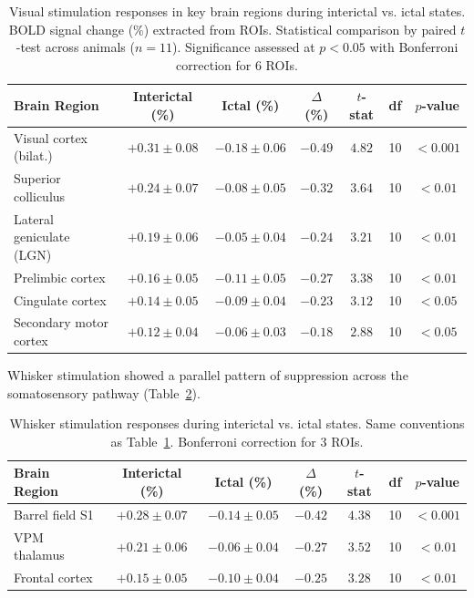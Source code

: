 \documentclass[11pt]{article}
\begin{document}
\begin{table}[H]
\centering
\caption{Visual stimulation responses in key brain regions during interictal vs. ictal states. BOLD signal change (\%) extracted from ROIs. Statistical comparison by paired $t$-test across animals ($n = 11$). Significance assessed at $p < 0.05$ with Bonferroni correction for 6 ROIs.}
\label{tab:visual}
\begin{tabular}{lcccccc}
\toprule
\textbf{Brain Region} & \textbf{Interictal (\%)} & \textbf{Ictal (\%)} & \textbf{$\Delta$ (\%)} & \textbf{$t$-stat} & \textbf{df} & \textbf{$p$-value} \\
\midrule
Visual cortex (bilat.) & $+0.31 \pm 0.08$ & $-0.18 \pm 0.06$ & $-0.49$ & $4.82$ & 10 & $< 0.001$ \\
Superior colliculus & $+0.24 \pm 0.07$ & $-0.08 \pm 0.05$ & $-0.32$ & $3.64$ & 10 & $< 0.01$ \\
Lateral geniculate (LGN) & $+0.19 \pm 0.06$ & $-0.05 \pm 0.04$ & $-0.24$ & $3.21$ & 10 & $< 0.01$ \\
Prelimbic cortex & $+0.16 \pm 0.05$ & $-0.11 \pm 0.05$ & $-0.27$ & $3.38$ & 10 & $< 0.01$ \\
Cingulate cortex & $+0.14 \pm 0.05$ & $-0.09 \pm 0.04$ & $-0.23$ & $3.12$ & 10 & $< 0.05$ \\
Secondary motor cortex & $+0.12 \pm 0.04$ & $-0.06 \pm 0.03$ & $-0.18$ & $2.88$ & 10 & $< 0.05$ \\
\bottomrule
\end{tabular}
\end{table}

Whisker stimulation showed a parallel pattern of suppression across the somatosensory pathway (Table~\ref{tab:whisker}).

\begin{table}[H]
\centering
\caption{Whisker stimulation responses during interictal vs. ictal states. Same conventions as Table~\ref{tab:visual}. Bonferroni correction for 3 ROIs.}
\label{tab:whisker}
\begin{tabular}{lcccccc}
\toprule
\textbf{Brain Region} & \textbf{Interictal (\%)} & \textbf{Ictal (\%)} & \textbf{$\Delta$ (\%)} & \textbf{$t$-stat} & \textbf{df} & \textbf{$p$-value} \\
\midrule
Barrel field S1 & $+0.28 \pm 0.07$ & $-0.14 \pm 0.05$ & $-0.42$ & $4.38$ & 10 & $< 0.001$ \\
VPM thalamus & $+0.21 \pm 0.06$ & $-0.06 \pm 0.04$ & $-0.27$ & $3.52$ & 10 & $< 0.01$ \\
Frontal cortex & $+0.15 \pm 0.05$ & $-0.10 \pm 0.04$ & $-0.25$ & $3.28$ & 10 & $< 0.01$ \\
\bottomrule
\end{tabular}
\end{table}
\end{document}
